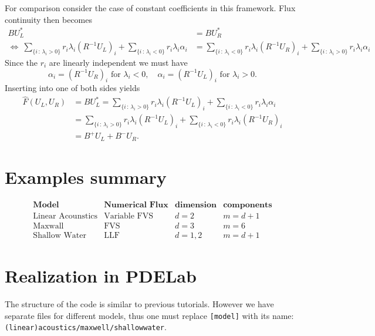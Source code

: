 \documentclass[a4paper,12pt]{article}
\theoremstyle{definition}
\theoremstyle{definition}
\begin{document}
For comparison consider the case of constant coefficients in this framework.
Flux continuity then becomes
\begin{align*}
B U_L^\ast &= B U_R^\ast\\
\Leftrightarrow\ 
\sum_{\{i \,:\, \lambda_i> 0\}} r_i \lambda_i (R^{-1} U_L)_i + \sum_{\{i \,:\, \lambda_i<0\}} r_i \lambda_i \alpha_i
&= \sum_{\{i \,:\, \lambda_i< 0\}} r_i \lambda_i (R^{-1} U_R)_i + \sum_{\{i \,:\, \lambda_i>0\}} r_i \lambda_i \alpha_i 
\end{align*}
Since the $r_i$ are linearly independent we must have
\begin{equation*}
\alpha_i = (R^{-1} U_R)_i\text{ for $\lambda_i<0$}, \quad 
\alpha_i = (R^{-1} U_L)_i\text{ for $\lambda_i>0$}.
\end{equation*}
Inserting into one of both sides yields
\begin{equation*}
\begin{split}
\hat F(U_L,U_R) &= B U_L^\ast = \sum_{\{i \,:\, \lambda_i> 0\}} r_i \lambda_i (R^{-1} U_L)_i + \sum_{\{i \,:\, \lambda_i<0\}} r_i \lambda_i \alpha_i\\
&= \sum_{\{i \,:\, \lambda_i> 0\}} r_i \lambda_i (R^{-1} U_L)_i + \sum_{\{i \,:\, \lambda_i<0\}} r_i \lambda_i (R^{-1} U_R)_i\\
&= B^+U_L + B^- U_R .
\end{split}
\end{equation*}

\section{Examples summary}

$$
\begin{array}{c|c|c|c}
	\textbf{Model} & \textbf{Numerical Flux} & \textbf{dimension} & \textbf{components} \\  \hline
	\text{Linear Acounstics} & \text{Variable FVS} & d = 2 & m = d + 1  \\
 	\text{Maxwall       }    & \text{FVS} & d = 3 & m = 6 \\
 	\text{Shallow Water} & \text{LLF} & d = 1,2 & m = d+1
\end{array}
$$
\section{Realization in PDELab}

The structure of the code is similar to previous tutorials. However we have separate files for different models, thus one must replace \lstinline{[model]} with its name: \lstinline{(linear)acoustics/maxwell/shallowwater}. 
\end{document}
